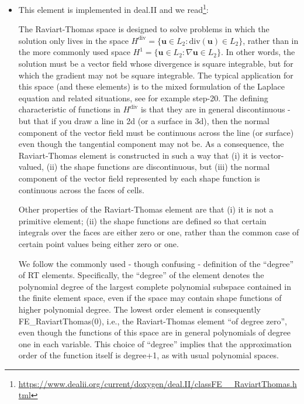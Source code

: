 \begin{itemize}
\item
This element is implemented in deal.II and we 
read\footnote{\url{https://www.dealii.org/current/doxygen/deal.II/classFE__RaviartThomas.html}}:
\begin{displayquote}
{\color{darkgray}
The Raviart-Thomas space is designed to solve problems in which the solution only 
lives in the space $H^{\text{div}}=\{ {\bm u} \in L_2 :\text{div}({\bm u}) \in L_2\}$, 
rather than in the more commonly used space $H^1=\{ {\bm u} \in L_2 : \nabla {\bm u} \in L_2 \}$. 
In other words, the solution must be a vector field whose divergence is square integrable, 
but for which the gradient may not be square integrable. The typical application for this space 
(and these elements) is to the mixed formulation of the Laplace equation and related situations, 
see for example step-20. The defining characteristic of functions in  $H^{\text{div}}$ is that they are 
in general discontinuous - but that if you draw a line in 2d (or a surface in 3d), 
then the normal component of the vector field must be continuous across the line (or surface) 
even though the tangential component may not be. As a consequence, the Raviart-Thomas element 
is constructed in such a way that (i) it is vector-valued, (ii) the shape functions are 
discontinuous, but (iii) the normal component of the vector field represented by each shape 
function is continuous across the faces of cells.

Other properties of the Raviart-Thomas element are that 
(i) it is not a primitive element; (ii) the shape functions are defined so that 
certain integrals over the faces are 
either zero or one, rather than the common case of certain point values being 
either zero or one. 

We follow the commonly used - though confusing - definition of the ``degree'' of RT elements. 
Specifically, the ``degree'' of the element denotes the polynomial degree of the 
largest complete polynomial subspace contained in the finite element space, 
even if the space may contain shape functions of higher polynomial degree. 
The lowest order element is consequently FE\_RaviartThomas(0), i.e., 
the Raviart-Thomas element ``of degree zero'', even though the functions of this space 
are in general polynomials of degree one in each variable. This choice of ``degree'' 
implies that the approximation order of the function itself is degree+1, as with usual polynomial spaces. 
}
\end{displayquote}


\end{itemize}
